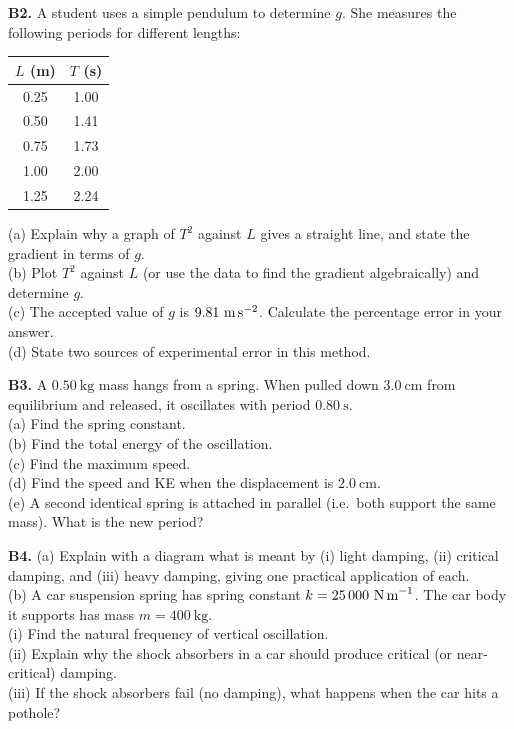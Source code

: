 \begin{exercisebox}[7]
\vspace{0.4cm}

\textbf{B2.} A student uses a simple pendulum to
determine $g$. She measures the following periods
for different lengths:

\begin{center}
\begin{tabular}{cc}
\toprule
$L$ (m) & $T$ (s)\\
\midrule
0.25 & 1.00\\
0.50 & 1.41\\
0.75 & 1.73\\
1.00 & 2.00\\
1.25 & 2.24\\
\bottomrule
\end{tabular}
\end{center}

(a) Explain why a graph of $T^2$ against $L$ gives
a straight line, and state the gradient in terms of $g$.\\
(b) Plot $T^2$ against $L$ (or use the data to find
the gradient algebraically) and determine $g$.\\
(c) The accepted value of $g$ is $9.81\ \text{m\,s}^{-2}$.
Calculate the percentage error in your answer.\\
(d) State two sources of experimental error in this
method.
\hfill{}

\vspace{0.4cm}

\textbf{B3.} A $0.50\ \text{kg}$ mass hangs from
a spring. When pulled down $3.0\ \text{cm}$ from
equilibrium and released, it oscillates with period
$0.80\ \text{s}$.\\[4pt]
(a) Find the spring constant.\\
(b) Find the total energy of the oscillation.\\
(c) Find the maximum speed.\\
(d) Find the speed and KE when the displacement is
$2.0\ \text{cm}$.\\
(e) A second identical spring is attached in parallel
(i.e.\ both support the same mass). What is the new
period?
\hfill{}

\vspace{0.4cm}

\textbf{B4.}
(a) Explain with a diagram what is meant by
(i) light damping, (ii) critical damping, and
(iii) heavy damping, giving one practical application
of each.\\[4pt]
(b) A car suspension spring has spring constant
$k = 25\,000\ \text{N\,m}^{-1}$. The car body it
supports has mass $m = 400\ \text{kg}$.\\
(i) Find the natural frequency of vertical oscillation.\\
(ii) Explain why the shock absorbers in a car should
produce critical (or near-critical) damping.\\
(iii) If the shock absorbers fail (no damping),
what happens when the car hits a pothole?
\hfill{}


\end{exercisebox}
